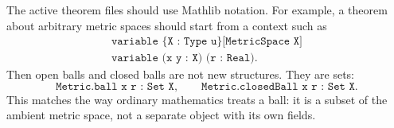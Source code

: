 \begin{remark*}
The active theorem files should use Mathlib notation. For example, a theorem
about arbitrary metric spaces should start from a context such as
\[
\begin{gathered}
  \texttt{variable \{X : Type u\} [MetricSpace X]}\\
  \texttt{variable (x y : X) (r : Real).}
\end{gathered}
\]
Then open balls and closed balls are not new structures. They are sets:
\[
  \texttt{Metric.ball x r : Set X},
  \qquad
  \texttt{Metric.closedBall x r : Set X}.
\]
This matches the way ordinary mathematics treats a ball: it is a subset of the
ambient metric space, not a separate object with its own fields.
\end{remark*}
